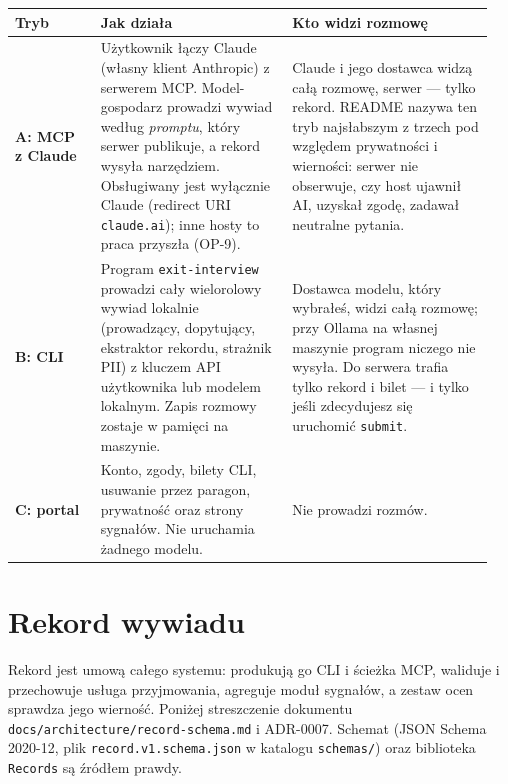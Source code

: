 \begin{longtable}{@{}p{0.17\linewidth}p{0.38\linewidth}p{0.4\linewidth}@{}}
\toprule
Tryb & Jak działa & Kto widzi rozmowę \\
\midrule
\endhead
\textbf{A: MCP z Claude} &
Użytkownik łączy Claude (własny klient Anthropic) z serwerem MCP.
Model-gospodarz prowadzi wywiad według \emph{promptu}, który serwer publikuje,
a rekord wysyła narzędziem. Obsługiwany jest wyłącznie Claude (redirect URI
\texttt{claude.ai}); inne hosty to praca przyszła (OP-9). &
Claude i jego dostawca widzą całą rozmowę, serwer --- tylko rekord. README
nazywa ten tryb najsłabszym z trzech pod względem prywatności i wierności:
serwer nie obserwuje, czy host ujawnił AI, uzyskał zgodę, zadawał neutralne
pytania. \\
\textbf{B: CLI} &
Program \texttt{exit-interview} prowadzi cały wielorolowy wywiad lokalnie
(prowadzący, dopytujący, ekstraktor rekordu, strażnik PII) z kluczem API
użytkownika lub modelem lokalnym. Zapis rozmowy zostaje w pamięci na maszynie. &
Dostawca modelu, który wybrałeś, widzi całą rozmowę; przy Ollama na własnej
maszynie program niczego nie wysyła. Do serwera trafia tylko rekord
i bilet --- i tylko jeśli zdecydujesz się uruchomić \texttt{submit}. \\
\textbf{C: portal} &
Konto, zgody, bilety CLI, usuwanie przez paragon, prywatność oraz strony
sygnałów. Nie uruchamia żadnego modelu. & Nie prowadzi rozmów. \\
\bottomrule
\end{longtable}


\section{Rekord wywiadu}

Rekord jest umową całego systemu: produkują go CLI i ścieżka MCP, waliduje
i przechowuje usługa przyjmowania, agreguje moduł sygnałów, a zestaw ocen
sprawdza jego wierność. Poniżej streszczenie dokumentu
\texttt{docs/architecture/}\allowbreak\texttt{record-schema.md} i ADR-0007. Schemat
(JSON Schema 2020-12, plik \texttt{record.v1.schema.json} w katalogu \texttt{schemas/})
oraz biblioteka \texttt{Records} są źródłem prawdy.

